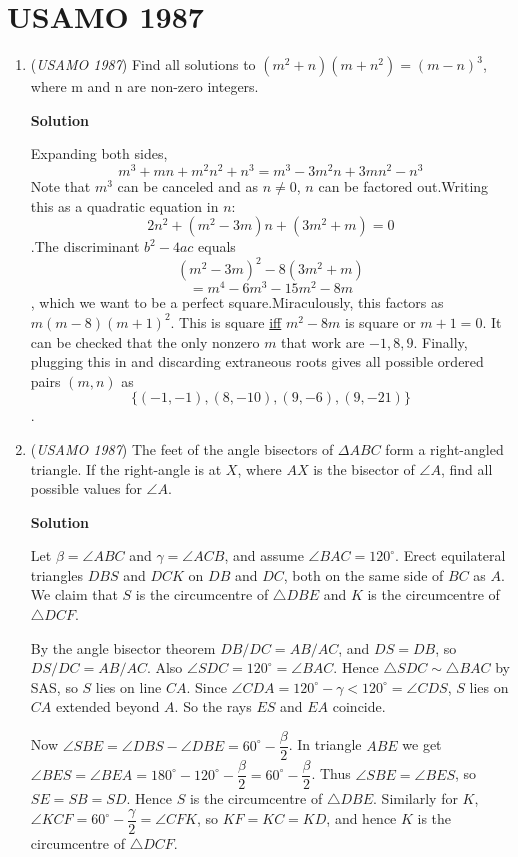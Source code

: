\section{USAMO 1987}
        \begin{enumerate}
        	\item (\textit{USAMO 1987}) Find all solutions to $(m^2+n)(m + n^2)= (m - n)^3$, where m and n are non-zero integers.


 



\textbf{Solution}

Expanding both sides, 
 \[m^3+mn+m^2n^2+n^3=m^3-3m^2n+3mn^2-n^3\]Note that $m^3$ can be canceled and as $n \neq 0$, $n$ can be factored out.Writing this as a quadratic equation in $n$: 
 \[2n^2+(m^2-3m)n+(3m^2+m)=0\].The discriminant $b^2-4ac$ equals 
 \[(m^2-3m)^2-8(3m^2+m)\]
 \[=m^4-6m^3-15m^2-8m\], which we want to be a perfect square.Miraculously, this factors as $m(m-8)(m+1)^2$. This is square \href{https://artofproblemsolving.com/wiki/index.php?title=Iff}{iff} $m^2-8m$ is square or $m+1=0$. It can be checked that the only nonzero $m$ that work are $-1, 8, 9$. Finally, plugging this in and discarding extraneous roots gives all possible ordered pairs $(m, n)$ as 
 \[\{(-1,-1),(8,-10),(9,-6),(9,-21)\}\].

 


	\item (\textit{USAMO 1987}) The feet of the angle bisectors of $\Delta ABC$ form a right-angled triangle. If the right-angle is at $X$, where $AX$ is the bisector of $\angle A$, find all possible values for $\angle A$.


 



\textbf{Solution}

Let $\beta=\angle ABC$ and $\gamma=\angle ACB$, and assume $\angle BAC=120^\circ$. Erect equilateral triangles $DBS$ and $DCK$ on $DB$ and $DC$, both on the same side of $BC$ as $A$. We claim that $S$ is the circumcentre of $\triangle DBE$ and $K$ is the circumcentre of $\triangle DCF$.

 By the angle bisector theorem $DB/DC=AB/AC$, and $DS=DB$, so $DS/DC=AB/AC$. Also $\angle SDC=120^\circ=\angle BAC$. Hence $\triangle SDC\sim\triangle BAC$ by SAS, so $S$ lies on line $CA$. Since $\angle CDA=120^\circ-\gamma<120^\circ=\angle CDS$, $S$ lies on $CA$ extended beyond $A$. So the rays $ES$ and $EA$ coincide.

 Now $\angle SBE=\angle DBS-\angle DBE=60^\circ-\dfrac{\beta}{2}$. In triangle $ABE$ we get $\angle BES=\angle BEA=180^\circ-120^\circ-\dfrac{\beta}{2}=60^\circ-\dfrac{\beta}{2}$. Thus $\angle SBE=\angle BES$, so $SE=SB=SD$. Hence $S$ is the circumcentre of $\triangle DBE$. Similarly for $K$, $\angle KCF=60^\circ-\dfrac{\gamma}{2}=\angle CFK$, so $KF=KC=KD$, and hence $K$ is the circumcentre of $\triangle DCF$.


\end{enumerate}

